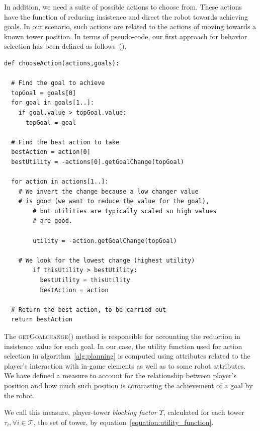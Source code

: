 In addition, we need a suite of possible actions to choose from. These actions have the function of reducing insistence and direct the robot towards achieving goals. In our scenario, such actions are related to the actions of moving towards a known tower position. In terms of pseudo-code, our first approach for behavior selection has been defined as follows~(\cite{millington_artificial_2009}).

\begin{lstlisting}[caption=A basic~\gls{gob} algorithm for action selection.]
def chooseAction(actions,goals):

  # Find the goal to achieve    
  topGoal = goals[0]
  for goal in goals[1..]:
    if goal.value > topGoal.value:
      topGoal = goal
    	
  # Find the best action to take
  bestAction = action[0]
  bestUtility = -actions[0].getGoalChange(topGoal)

  for action in actions[1..]:
    # We invert the change because a low changer value 
    # is good (we want to reduce the value for the goal),
    	# but utilities are typically scaled so high values 
    	# are good.
    		
    	utility = -action.getGoalChange(topGoal)
    		
    # We look for the lowest change (highest utility)
    	if thisUtility > bestUtility:
    	  bestUtility = thisUtility 
    	  bestAction = action
    			
  # Return the best action, to be carried out
  return bestAction
\end{lstlisting}\label{alg:planning}

The \textsc{getGoalchange()} method is responsible for accounting the reduction in insistence value for each goal. In our case, the utility function used for action selection in algorithm~\ref{alg:planning} is computed using attributes related to the player's interaction with in-game elements as well as to some robot attributes. We have defined a measure to account for the relationship between player's position and how much such position is contrasting the achievement of a goal by the robot.

We call this measure, player-tower \textit{blocking factor} $\Upsilon$, calculated for each tower  $\tau_{i},\forall i \in \mathcal{T}$, the set of tower, by equation~\ref{equation:utility_function}. 

